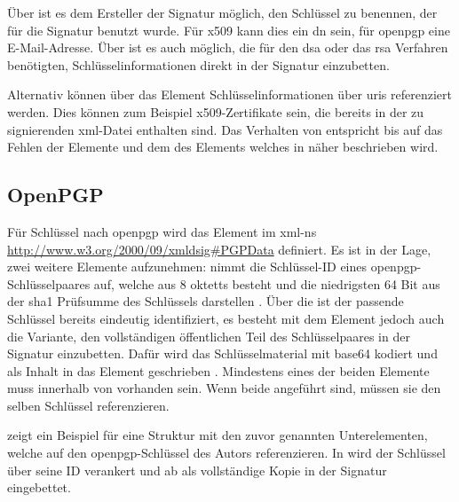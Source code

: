 Über  ist es dem Ersteller der Signatur möglich, den Schlüssel zu benennen, der für die Signatur benutzt wurde. Für \gls{x509} kann dies ein
\gls{dn} sein, für \gls{openpgp} eine E-Mail-Adresse. Über  ist es auch möglich, die für den \gls{dsa} oder das \gls{rsa} Verfahren
benötigten, Schlüsselinformationen direkt in der Signatur einzubetten.

Alternativ können über das Element  Schlüsselinformationen über \glspl{uri} referenziert werden. Dies können zum Beispiel
\gls{x509}-Zertifikate sein, die bereits in der zu signierenden \gls{xml}-Datei enthalten sind. Das Verhalten von  entspricht bis auf
das Fehlen der Elemente  und  dem des Elements  welches in 
näher beschrieben wird.

\subsection{OpenPGP}
Für Schlüssel nach \gls{openpgp} wird das Element  im \gls{xml-ns} \url{http://www.w3.org/2000/09/xmldsig#PGPData} definiert. Es ist in der
Lage, zwei weitere Elemente aufzunehmen:  nimmt die Schlüssel-ID eines \gls{openpgp}-Schlüsselpaares auf, welche aus 8 \glspl{oktett} besteht und die
niedrigsten 64 Bit aus der \gls{sha1} Prüfsumme des Schlüssels darstellen \cite{openpgp:ietf}. Über die  ist der passende Schlüssel bereits eindeutig
identifiziert, es besteht mit dem Element  jedoch auch die Variante, den vollständigen öffentlichen Teil des Schlüsselpaares in der
Signatur einzubetten. Dafür wird das Schlüsselmaterial mit \gls{base64} kodiert und als Inhalt in das Element geschrieben \cite{xml-dsig:w3c}. Mindestens eines
der beiden Elemente muss innerhalb von  vorhanden sein. Wenn beide angeführt sind, müssen sie den selben Schlüssel referenzieren.

 zeigt ein Beispiel für eine Struktur mit den zuvor genannten Unterelementen, welche auf den \gls{openpgp}-Schlüssel des Autors
referenzieren. In  wird der Schlüssel über seine ID verankert und ab  als
vollständige Kopie in der Signatur eingebettet.



